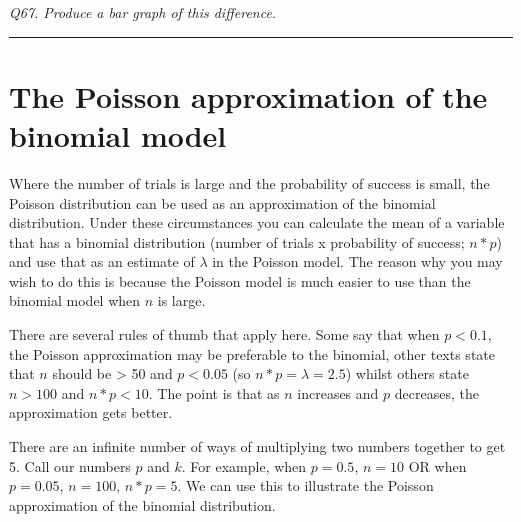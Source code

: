 \documentclass[
  11pt,
  a4paper,
]{book}
\begin{document}
\emph{Q67. Produce a bar graph of this difference.}

\begin{center}\rule{0.5\linewidth}{0.5pt}\end{center}

\hypertarget{the-poisson-approximation-of-the-binomial-model}{%
\section{The Poisson approximation of the binomial model}\label{the-poisson-approximation-of-the-binomial-model}}

Where the number of trials is large and the probability of success is small, the Poisson distribution can be used as an approximation of the binomial distribution. Under these circumstances you can calculate the mean of a variable that has a binomial distribution (number of trials x probability of success; \(n*p\)) and use that as an estimate of \(\lambda\) in the Poisson model. The reason why you may wish to do this is because the Poisson model is much easier to use than the binomial model when \(n\) is large.

There are several rules of thumb that apply here. Some say that when \(p<0.1\), the Poisson approximation may be preferable to the binomial, other texts state that \(n\) should be \textgreater{} 50 and \(p<0.05\) (so \(n * p = \lambda = 2.5\)) whilst others state \(n>100\) and \(n*p<10\). The point is that as \(n\) increases and \(p\) decreases, the approximation gets better.

There are an infinite number of ways of multiplying two numbers together to get 5. Call our numbers \(p\) and \(k\). For example, when \(p=0.5\), \(n=10\) OR when \(p=0.05\), \(n=100\), \(n*p=5\). We can use this to illustrate the Poisson approximation of the binomial distribution.
\end{document}

